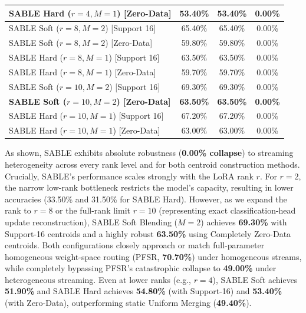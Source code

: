 \begin{table}[htbp]
\begin{center}
\begin{small}
\begin{sc}
\begin{tabular}{lccc}
SABLE Hard ($r=4, M=1$) [Zero-Data] & 53.40\% & 53.40\% & 0.00\% \\
\midrule
SABLE Soft ($r=8, M=2$) [Support 16] & 65.40\% & 65.40\% & 0.00\% \\
SABLE Soft ($r=8, M=2$) [Zero-Data] & 59.80\% & 59.80\% & 0.00\% \\
SABLE Hard ($r=8, M=1$) [Support 16] & 63.50\% & 63.50\% & 0.00\% \\
SABLE Hard ($r=8, M=1$) [Zero-Data] & 59.70\% & 59.70\% & 0.00\% \\
\midrule
SABLE Soft ($r=10, M=2$) [Support 16] & 69.30\% & 69.30\% & 0.00\% \\
\textbf{SABLE Soft ($r=10, M=2$) [Zero-Data]} & \textbf{63.50\%} & \textbf{63.50\%} & \textbf{0.00\%} \\
SABLE Hard ($r=10, M=1$) [Support 16] & 67.20\% & 67.20\% & 0.00\% \\
SABLE Hard ($r=10, M=1$) [Zero-Data] & 63.00\% & 63.00\% & 0.00\% \\
\bottomrule
\end{tabular}
\end{sc}
\end{small}
\end{center}
\vskip -0.1in
\end{table}

As shown, SABLE exhibits absolute robustness (\textbf{0.00\% collapse}) to streaming heterogeneity across every rank level and for both centroid construction methods. Crucially, SABLE's performance scales strongly with the LoRA rank $r$. For $r=2$, the narrow low-rank bottleneck restricts the model's capacity, resulting in lower accuracies (33.50\% and 31.50\% for SABLE Hard). However, as we expand the rank to $r=8$ or the full-rank limit $r=10$ (representing exact classification-head update reconstruction), SABLE Soft Blending ($M=2$) achieves \textbf{69.30\%} with Support-16 centroids and a highly robust \textbf{63.50\%} using Completely Zero-Data centroids. Both configurations closely approach or match full-parameter homogeneous weight-space routing (PFSR, \textbf{70.70\%}) under homogeneous streams, while completely bypassing PFSR's catastrophic collapse to \textbf{49.00\%} under heterogeneous streaming. Even at lower ranks (e.g., $r=4$), SABLE Soft achieves \textbf{51.90\%} and SABLE Hard achieves \textbf{54.80\%} (with Support-16) and \textbf{53.40\%} (with Zero-Data), outperforming static Uniform Merging (\textbf{49.40\%}).

